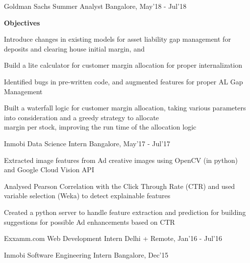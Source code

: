 
	
\cventry
	{Goldman Sachs}
	{Summer Analyst}
	{}
	{Bangalore, May'18 - Jul'18}
	{
		\begin{addmargin}{1em}
			\textbf{Objectives}
			\begin{cvitems}[$\circ$]
				\item Introduce changes in existing models for asset liability gap management for deposits and clearing house initial margin, and
				\item Build a lite calculator for customer margin allocation for proper internalization 
			\end{cvitems}
		\end{addmargin}
		\begin{cvitems}
			\item Identified bugs in pre-written code, and augmented features for proper AL Gap Management
			\item Built a waterfall logic for customer margin allocation, taking various parameters into consideration and a greedy strategy to allocate \\margin per stock, improving the run time of the allocation logic
		\end{cvitems}
	}

\cventry
	{Inmobi}
	{Data Science Intern}
	{}
	{Bangalore, May'17 - Jul'17}
	{
		\begin{cvitems}
			\item Extracted image features from Ad creative images using OpenCV (in python) and Google Cloud Vision API
			\item Analysed Pearson Correlation with the Click Through Rate (CTR) and used variable selection (Weka) to detect explainable features 
			\item Created a python server to handle feature extraction and prediction for building suggestions for possible Ad enhancements based on CTR
		\end{cvitems}
	}

\cventry
	{Exxamm.com}
	{Web Development Intern}
	{}
	{Delhi + Remote, Jan'16 - Jul'16}
	{}

\cventry
	{Inmobi}
	{Software Engineering Intern}
	{}
	{Bangalore, Dec'15}
	{}


